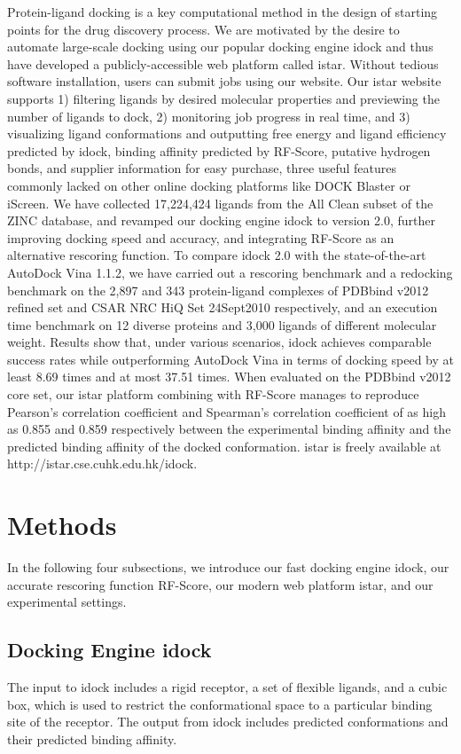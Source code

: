 Protein-ligand docking is a key computational method in the design of starting points for the drug discovery process. We are motivated by the desire to automate large-scale docking using our popular docking engine idock and thus have developed a publicly-accessible web platform called istar. Without tedious software installation, users can submit jobs using our website. Our istar website supports 1) filtering ligands by desired molecular properties and previewing the number of ligands to dock, 2) monitoring job progress in real time, and 3) visualizing ligand conformations and outputting free energy and ligand efficiency predicted by idock, binding affinity predicted by RF-Score, putative hydrogen bonds, and supplier information for easy purchase, three useful features commonly lacked on other online docking platforms like DOCK Blaster or iScreen. We have collected 17,224,424 ligands from the All Clean subset of the ZINC database, and revamped our docking engine idock to version 2.0, further improving docking speed and accuracy, and integrating RF-Score as an alternative rescoring function. To compare idock 2.0 with the state-of-the-art AutoDock Vina 1.1.2, we have carried out a rescoring benchmark and a redocking benchmark on the 2,897 and 343 protein-ligand complexes of PDBbind v2012 refined set and CSAR NRC HiQ Set 24Sept2010 respectively, and an execution time benchmark on 12 diverse proteins and 3,000 ligands of different molecular weight. Results show that, under various scenarios, idock achieves comparable success rates while outperforming AutoDock Vina in terms of docking speed by at least 8.69 times and at most 37.51 times. When evaluated on the PDBbind v2012 core set, our istar platform combining with RF-Score manages to reproduce Pearson's correlation coefficient and Spearman's correlation coefficient of as high as 0.855 and 0.859 respectively between the experimental binding affinity and the predicted binding affinity of the docked conformation. istar is freely available at http://istar.cse.cuhk.edu.hk/idock.

\section{Methods}
In the following four subsections, we introduce our fast docking engine idock, our accurate rescoring function RF-Score, our modern web platform istar, and our experimental settings.

\subsection{Docking Engine idock}
The input to idock includes a rigid receptor, a set of flexible ligands, and a cubic box, which is used to restrict the conformational space to a particular binding site of the receptor. The output from idock includes predicted conformations and their predicted binding affinity.

